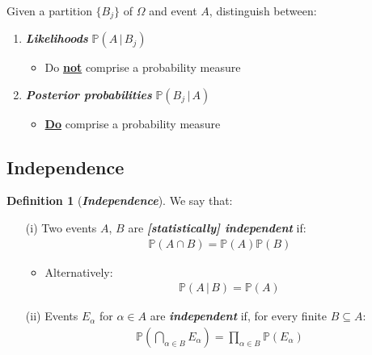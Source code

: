 \documentclass[12pt]{extarticle}
\newcommand{\pstart}[0]{\noindent}
\newcommand{\term}[1]{\textbf{\textit{#1}}}
\theoremstyle{definition}
\newtheorem*{definition}{Definition}
\theoremstyle{remark}
\newcommand{\prob}[1]{\mathbb{P}\left(#1\right)}
\newcommand{\cond}[2]{#1\,\vert\,#2}
\begin{document}
~\\\pstart
Given a partition $\{B_j\}$ of $\Omega$ and event $A$, distinguish 
between: \begin{enumerate}
    \item \term{Likelihoods} $\prob{\cond{A}{B_j}}$ \begin{itemize}
        \item Do \ul{\textbf{not}} comprise a probability measure
    \end{itemize}
    \item \term{Posterior probabilities} $\prob{\cond{B_j}{A}}$ 
\begin{itemize}
        \item \textbf{\ul{Do}} comprise a probability measure
    \end{itemize}
\end{enumerate}

\subsection{Independence}
\begin{tcolorbox}[colback=red!80!yellow!10!white]
    \begin{definition}[\term{Independence}] We say that: 
        \begin{enumerate}
        \item[(i)] Two events $A$, $B$ are \term{[statistically] 
independent} if: \begin{align*}
            \prob{A\cap B}=\prob{A}\prob{B}
        \end{align*} \begin{itemize}
            \item Alternatively: \begin{align*}
                \prob{\cond{A}{B}}=\prob{A}
            \end{align*}
        \end{itemize}
        \item[(ii)] Events $E_\alpha$ for $\alpha\in A$ are 
\term{independent} if, for every finite $B\subseteq A$: \begin{align*}
            \prob{\bigcap_{\alpha\in B}E_\alpha}=\prod_{\alpha\in 
B}\prob{E_\alpha}
        \end{align*}
    \end{enumerate}
    \end{definition}    
\end{tcolorbox}
\end{document}
